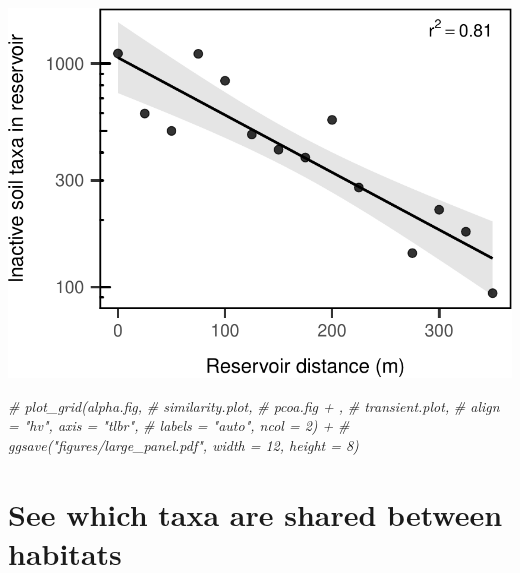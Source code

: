 \documentclass[]{article}
\newenvironment{Shaded}{\begin{snugshade}}{\end{snugshade}}
\newcommand{\CommentTok}[1]{\textcolor[rgb]{0.56,0.35,0.01}{\textit{#1}}}
\begin{document}
\begin{center}\includegraphics{ReservoirGradient_files/figure-latex/plot_transient-1} \end{center}

\begin{Shaded}
\begin{Highlighting}[]
\CommentTok{# plot_grid(alpha.fig, }
\CommentTok{#           similarity.plot, }
\CommentTok{#           pcoa.fig + , }
\CommentTok{#           transient.plot,}
\CommentTok{#           align = "hv", axis = "tlbr",}
\CommentTok{#           labels = "auto", ncol = 2) +}
\CommentTok{#   ggsave("figures/large_panel.pdf", width = 12, height = 8)}
\end{Highlighting}
\end{Shaded}

\hypertarget{see-which-taxa-are-shared-between-habitats}{%
\section{See which taxa are shared between
habitats}\label{see-which-taxa-are-shared-between-habitats}}
\end{document}
